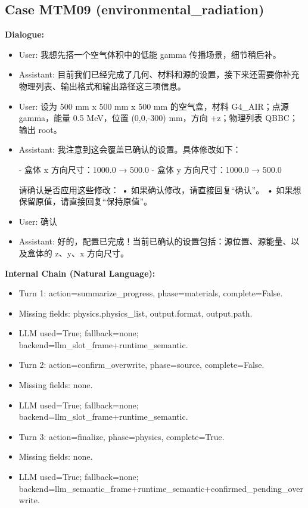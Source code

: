 \documentclass[11pt]{ctexart}
\begin{document}
\subsection{Case MTM09 (environmental\_radiation)}
\textbf{Dialogue:}
\begin{itemize}
\item User: 我想先搭一个空气体积中的低能 gamma 传播场景，细节稍后补。
\item Assistant: 目前我们已经完成了几何、材料和源的设置，接下来还需要你补充物理列表、输出格式和输出路径这三项信息。
\item User: 设为 500 mm x 500 mm x 500 mm 的空气盒，材料 G4\_AIR；点源 gamma，能量 0.5 MeV，位置 (0,0,-300) mm，方向 +z；物理列表 QBBC；输出 root。
\item Assistant: 我注意到这会覆盖已确认的设置。具体修改如下：

- 盒体 x 方向尺寸：1000.0 → 500.0
- 盒体 y 方向尺寸：1000.0 → 500.0

请确认是否应用这些修改：
• 如果确认修改，请直接回复“确认”。
• 如果想保留原值，请直接回复“保持原值”。
\item User: 确认
\item Assistant: 好的，配置已完成！当前已确认的设置包括：源位置、源能量、以及盒体的 z、y、x 方向尺寸。
\end{itemize}
\textbf{Internal Chain (Natural Language):}
\begin{itemize}
\item Turn 1: action=summarize\_progress, phase=materials, complete=False.
\item Missing fields: physics.physics\_list, output.format, output.path.
\item LLM used=True; fallback=none; backend=llm\_slot\_frame+runtime\_semantic.
\item Turn 2: action=confirm\_overwrite, phase=source, complete=False.
\item Missing fields: none.
\item LLM used=True; fallback=none; backend=llm\_slot\_frame+runtime\_semantic.
\item Turn 3: action=finalize, phase=physics, complete=True.
\item Missing fields: none.
\item LLM used=True; fallback=none; backend=llm\_semantic\_frame+runtime\_semantic+confirmed\_pending\_overwrite.
\end{itemize}
\end{document}
